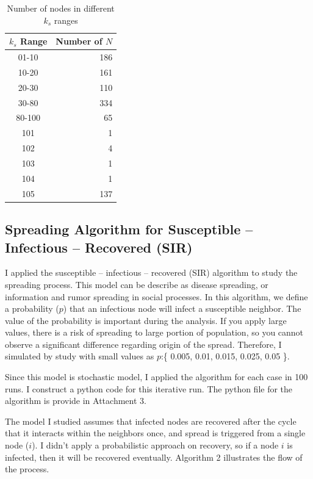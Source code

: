 \documentclass[11pt,a4,twocolumn]{article}
\begin{document}
\begin{table} [h]
\centering
\begin{tabular}{|c|r|}
\hline
 $k_{s}$ Range & Number of $N$ \\
\hline
01-10&186\\
10-20&161\\
20-30&110\\
30-80&334\\
80-100&65\\
101&	1\\
102&	4\\
103&	1\\
104&	1\\
105&	137\\
\hline
\end{tabular}
\caption{Number of nodes in different $k_{s}$ ranges}
\end{table}



\subsection{Spreading Algorithm for Susceptible – Infectious – Recovered (SIR) }

I applied the susceptible – infectious – recovered (SIR) algorithm to study the spreading process. This model can be describe as disease spreading, or information and rumor spreading in social processes. In this algorithm, we define a probability ($p$) that an infectious node will infect a susceptible neighbor. The value of the probability is important during the analysis. If you apply large values, there is a risk of spreading to large portion of population, so you cannot observe a significant difference regarding origin of the spread. Therefore, I simulated by study with small values as $p$:\{ 0.005, 0.01, 0.015, 0.025, 0.05 \}.

Since this model is  stochastic model, I applied the algorithm for each case in 100 runs. I construct a python code for this iterative run. The python file for the algorithm is provide in Attachment 3. 

The model I studied assumes that infected nodes are recovered after the cycle that it interacts within the neighbors once, and spread is triggered from a single node ($i$). I didn't apply a probabilistic approach on recovery, so if a node $i$ is infected, then it will be recovered eventually. Algorithm 2 illustrates the flow of the process.
\end{document}
